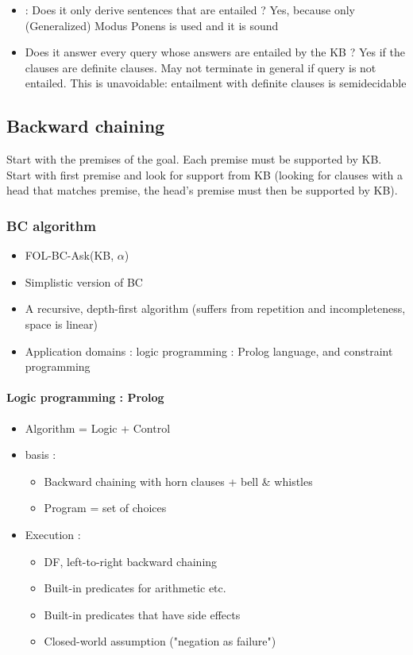 \begin{itemize}
\item {} : Does it only derive sentences that are entailed ? Yes, because only (Generalized) Modus Ponens is used and it is sound
\item Does it answer every query whose answers are entailed by the KB ? Yes if the clauses are definite clauses. May not terminate in general if query is not entailed. This is unavoidable: entailment with definite clauses is semidecidable
\end{itemize}

\subsection{Backward chaining}

Start with the premises of the goal. Each premise must be supported by KB. Start with first premise and look for support from KB (looking for clauses with a head that matches premise, the head's premise must then be supported by KB).

\subsubsection{BC algorithm}

\begin{itemize}
\item FOL-BC-Ask(KB, $\alpha$)
\item Simplistic version of BC
\item A recursive, depth-first algorithm (suffers from repetition and incompleteness, space is linear)
\item Application domains : logic programming : Prolog language, and constraint programming
\end{itemize}

\newpage
\paragraph{Logic programming : Prolog}

\begin{itemize}
\item Algorithm = Logic + Control
\item basis :
	\begin{itemize}
	\item Backward chaining with horn clauses + bell \& whistles
	\item Program = set of choices
	\end{itemize}
\item Execution :
	\begin{itemize}
	\item DF, left-to-right backward chaining
	\item Built-in predicates for arithmetic etc.
	\item Built-in predicates that have side effects
	\item Closed-world assumption ("negation as failure")
	\end{itemize}
\end{itemize}

